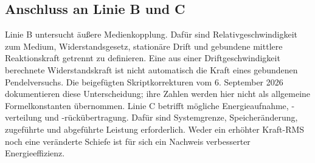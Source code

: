 \documentclass[11pt,a4paper]{article}
\begin{document}
\subsection{Anschluss an Linie B und C}
Linie B untersucht äußere Medienkopplung. Dafür sind Relativgeschwindigkeit zum Medium, Widerstandsgesetz, stationäre Drift und gebundene mittlere Reaktionskraft getrennt zu definieren. Eine aus einer Driftgeschwindigkeit berechnete Widerstandskraft ist nicht automatisch die Kraft eines gebundenen Pendelversuchs. Die beigefügten Skriptkorrekturen vom 6. September 2026 dokumentieren diese Unterscheidung; ihre Zahlen werden hier nicht als allgemeine Formelkonstanten übernommen.
Linie C betrifft mögliche Energieaufnahme, -verteilung und -rückübertragung. Dafür sind Systemgrenze, Speicheränderung, zugeführte und abgeführte Leistung erforderlich. Weder ein erhöhter Kraft-RMS noch eine veränderte Schiefe ist für sich ein Nachweis verbesserter Energieeffizienz.
\end{document}
